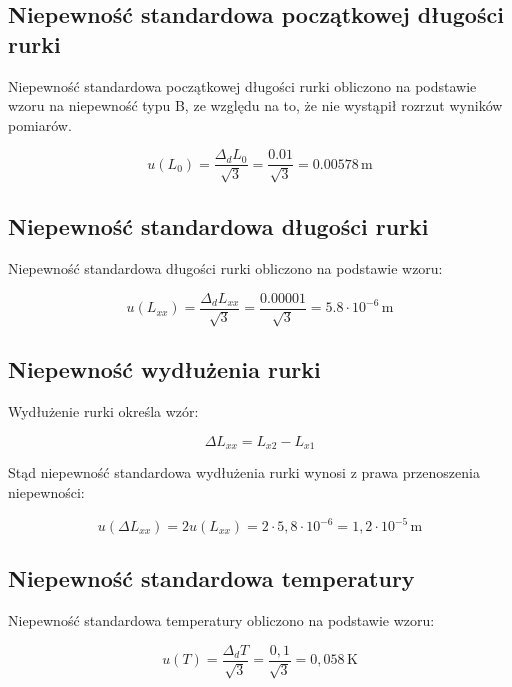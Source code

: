 \documentclass[a4paper,12pt]{article}
\begin{document}
\subsection{Niepewność standardowa początkowej długości rurki}

Niepewność standardowa początkowej długości rurki obliczono na podstawie wzoru na niepewność typu B, ze względu na to, że nie wystąpił rozrzut wyników pomiarów.

\begin{equation*}
    u(L_0) = \frac{\Delta_d L_0}{\sqrt{3}} = \frac{0.01}{\sqrt{3}} = 0.00578\,\text{m}
\end{equation*}

\subsection{Niepewność standardowa długości rurki}

Niepewność standardowa długości rurki obliczono na podstawie wzoru:

\begin{equation*}
    u(L_{xx}) = \frac{\Delta_d L_{xx}}{\sqrt{3}} = \frac{0.00001}{\sqrt{3}} = 5.8 \cdot 10^{-6}\,\text{m}
\end{equation*}

\subsection{Niepewność wydłużenia rurki}

Wydłużenie rurki określa wzór:

\begin{equation*}
    \Delta L_{xx} = L_{x2} - L_{x1}
\end{equation*}

Stąd niepewność standardowa wydłużenia rurki wynosi z prawa przenoszenia niepewności:

\begin{equation*}
    u(\Delta L_{xx}) = 2 u(L_{xx}) = 2 \cdot 5{,}8 \cdot 10^{-6} = 1{,}2 \cdot 10^{-5}\,\text{m}
\end{equation*}

\subsection{Niepewność standardowa temperatury}

Niepewność standardowa temperatury obliczono na podstawie wzoru:

\begin{equation*}
    u(T) = \frac{\Delta_d T}{\sqrt{3}} = \frac{0{,}1}{\sqrt{3}} = 0{,}058\,\text{K}
\end{equation*}
\end{document}
